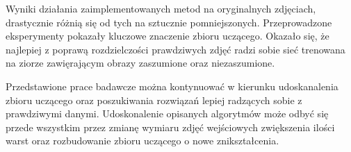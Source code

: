 \documentclass[a4paper,12pt,twoside,openany]{report}
\begin{document}
Wyniki działania zaimplementowanych metod na oryginalnych zdjęciach, drastycznie różnią się od tych na sztucznie pomniejszonych. Przeprowadzone eksperymenty pokazały kluczowe znaczenie zbioru uczącego. Okazało się, że najlepiej z poprawą rozdzielczości prawdziwych zdjęć radzi sobie sieć trenowana na ziorze zawięrającym obrazy zaszumione oraz niezaszumione.

Przedstawione prace badawcze można kontynuować w kierunku udoskanalenia zbioru uczącego oraz poszukiwania rozwiązań lepiej radzących sobie z prawdziwymi danymi. Udoskonalenie opisanych algorytmów może odbyć się przede wszystkim przez zmianę wymiaru zdjęć wejściowych zwiększenia ilości warst oraz rozbudowanie zbioru uczącego o nowe znikształcenia.


\end{document}
